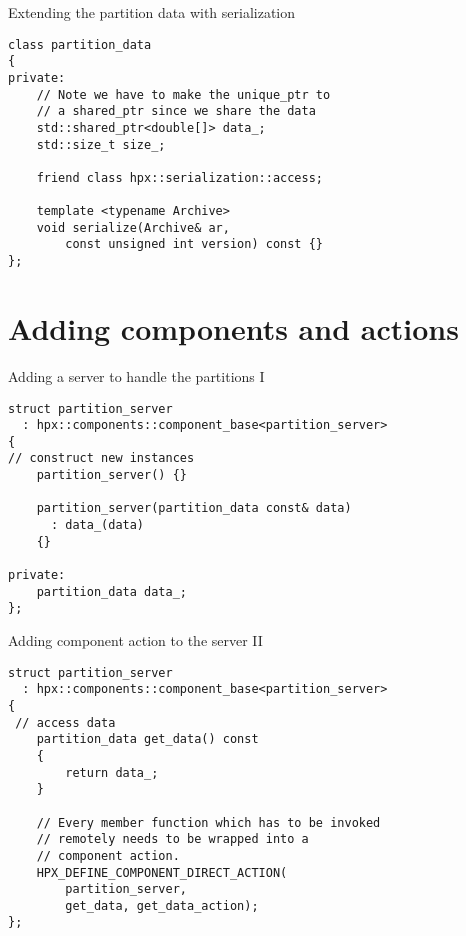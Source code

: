 \documentclass[12pt,t]{beamer}
\begin{document}
\begin{frame}[fragile]{Extending the partition data with serialization}
\begin{lstlisting}
class partition_data
{
private:
    // Note we have to make the unique_ptr to 
    // a shared_ptr since we share the data
    std::shared_ptr<double[]> data_;
    std::size_t size_;

    friend class hpx::serialization::access;

    template <typename Archive>
    void serialize(Archive& ar, 
        const unsigned int version) const {}
};
\end{lstlisting}

\end{frame}


\section{Adding components and actions}

\begin{frame}[fragile]{Adding a server to handle the partitions I}

\begin{lstlisting}
struct partition_server
  : hpx::components::component_base<partition_server>
{
// construct new instances
    partition_server() {}

    partition_server(partition_data const& data)
      : data_(data)
    {}
    
private:
    partition_data data_;
};
\end{lstlisting}

\end{frame}

\begin{frame}[fragile]{Adding component action to the server II}

\begin{lstlisting}
struct partition_server
  : hpx::components::component_base<partition_server>
{
 // access data
    partition_data get_data() const
    {
        return data_;
    }

    // Every member function which has to be invoked 
    // remotely needs to be wrapped into a 
    // component action.
    HPX_DEFINE_COMPONENT_DIRECT_ACTION(
        partition_server, 
        get_data, get_data_action);
};
\end{lstlisting}

\end{frame}
\end{document}
